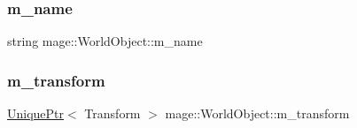 \subsubsection{\texorpdfstring{m\+\_\+name}{m\_name}}
{\footnotesize\ttfamily string mage\+::\+World\+Object\+::m\+\_\+name\hspace{0.3cm}{\ttfamily [private]}}

\hypertarget{classmage_1_1_world_object_aa9b856a22731a70f9200e79d0f9a45ee}{}\label{classmage_1_1_world_object_aa9b856a22731a70f9200e79d0f9a45ee} 
\subsubsection{\texorpdfstring{m\+\_\+transform}{m\_transform}}
{\footnotesize\ttfamily \hyperlink{namespacemage_a8c307fbcc33bce9b7f2aa4c26c3b95cf}{Unique\+Ptr}$<$ Transform $>$ mage\+::\+World\+Object\+::m\+\_\+transform\hspace{0.3cm}{\ttfamily [private]}}

